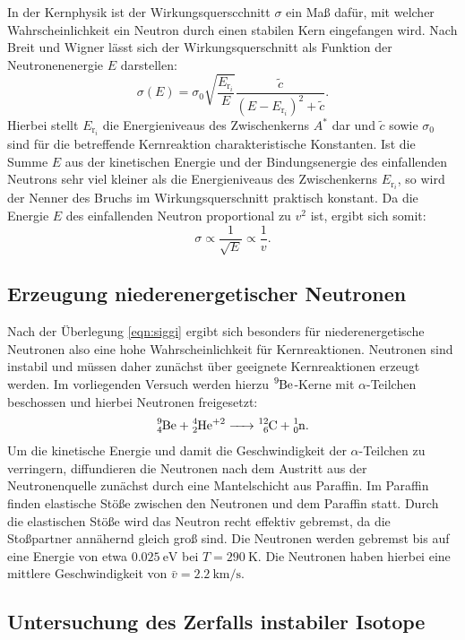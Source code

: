 In der Kernphysik ist der Wirkungsquerscchnitt $\sigma$ ein Maß dafür, mit welcher Wahrscheinlichkeit ein Neutron durch einen stabilen Kern eingefangen wird.
Nach Breit und Wigner lässt sich der Wirkungsquerschnitt als Funktion der Neutronenenergie $E$ darstellen:
\begin{equation}
  \sigma (E)=\sigma _0 \sqrt{\frac{E_{\mathrm{r}_i}}{E}}\frac{\tilde{c}}{\left(E-E_{\mathrm{r}_i}\right)^2 +\tilde{c}} \text{.}
\end{equation}
Hierbei stellt $E_{\mathrm{r}_i}$ die Energieniveaus des Zwischenkerns $A^{*}$ dar und $\tilde{c}$ sowie $\sigma_0$ sind für die betreffende Kernreaktion charakteristische Konstanten.
Ist die Summe $E$ aus der kinetischen Energie und der Bindungsenergie des einfallenden Neutrons sehr viel kleiner als die Energieniveaus des Zwischenkerns $E_{\mathrm{r}_i}$, so wird der Nenner des Bruchs im Wirkungsquerschnitt praktisch konstant. Da die Energie $E$ des einfallenden Neutron proportional zu $v^2$ ist, ergibt sich somit:
\begin{equation}
  \label{eqn:siggi}
  \sigma \propto \frac{1}{\sqrt{E}}\propto \frac{1}{v} \text{.}
\end{equation}

\subsection{Erzeugung niederenergetischer Neutronen}
Nach der Überlegung \ref{eqn:siggi} ergibt sich besonders für niederenergetische Neutronen also eine hohe Wahrscheinlichkeit für Kernreaktionen.
Neutronen sind instabil und müssen daher zunächst über geeignete Kernreaktionen erzeugt werden.
Im vorliegenden Versuch werden hierzu $\ce{^{9}Be}$-Kerne mit $\alpha$-Teilchen beschossen und hierbei Neutronen freigesetzt:
\begin{align}
    \ce{ ^{9}_4Be + ^{4}_2He^{+ 2}  -> ^{12}_6C + ^{1}_0n}\text{.}
\end{align}
Um die kinetische Energie und damit die Geschwindigkeit der $\alpha$-Teilchen zu verringern, diffundieren die Neutronen nach dem Austritt aus der Neutronenquelle zunächst durch eine Mantelschicht aus Paraffin. Im Paraffin finden elastische Stöße zwischen den Neutronen und dem Paraffin statt. Durch die elastischen Stöße wird das Neutron recht effektiv gebremst, da die Stoßpartner annähernd gleich groß sind.
Die Neutronen werden gebremst bis auf eine Energie von etwa $\SI{0.025}{\electronvolt}$ bei $T=\SI{290}{\kelvin}$. Die Neutronen haben hierbei eine mittlere Geschwindigkeit von $\bar{v}=\SI{2.2}{\kilo\meter\per\second}$.

\subsection{Untersuchung des Zerfalls instabiler Isotope}
